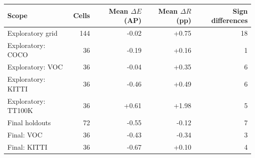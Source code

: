 \begin{tabular}{lrrrr}
\toprule
Scope & Cells & Mean $\Delta E$ (AP) & Mean $\Delta R$ (pp) & Sign differences \\
\midrule
Exploratory grid & 144 & -0.02 & +0.75 & 18 \\
Exploratory: COCO & 36 & -0.19 & +0.16 & 1 \\
Exploratory: VOC & 36 & -0.04 & +0.35 & 6 \\
Exploratory: KITTI & 36 & -0.46 & +0.49 & 6 \\
Exploratory: TT100K & 36 & +0.61 & +1.98 & 5 \\
Final holdouts & 72 & -0.55 & -0.12 & 7 \\
Final: VOC & 36 & -0.43 & -0.34 & 3 \\
Final: KITTI & 36 & -0.67 & +0.10 & 4 \\
\bottomrule
\end{tabular}
